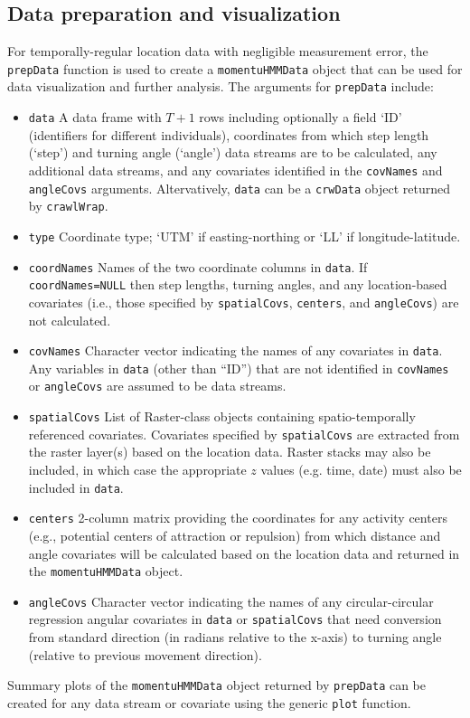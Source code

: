\documentclass[12pt]{article}
\begin{document}
\subsection{Data preparation and visualization}
For temporally-regular location data with negligible measurement error, the \verb|prepData| function is used to create a \verb|momentuHMMData| object that can be used for data visualization and further analysis. The arguments for \verb|prepData| include:
\begin{itemize}
  \item{\verb|data|} A data frame with $T+1$ rows including optionally a field `ID' (identifiers for different individuals), coordinates from which step length (`step') and turning angle (`angle') data streams are to be calculated, any additional data streams, and any covariates identified in the \verb|covNames| and \verb|angleCovs| arguments. Altervatively, \verb|data| can be a \verb|crwData| object returned by \verb|crawlWrap|.
  \item{\verb|type|} Coordinate type; `UTM' if easting-northing or `LL' if longitude-latitude.
  \item{\verb|coordNames|} Names of the two coordinate columns in \verb|data|. If \verb|coordNames=NULL| then step lengths, turning angles, and any location-based covariates (i.e., those specified by \verb|spatialCovs|, \verb|centers|, and \verb|angleCovs|) are not calculated.
  \item{\verb|covNames|} Character vector indicating the names of any covariates in \verb|data|. Any variables in \verb|data| (other than ``ID'') that are not identified in \verb|covNames| or \verb|angleCovs| are assumed to be data streams.
  \item{\verb|spatialCovs|} List of Raster-class objects \citep{Hijmans2016} containing spatio-temporally referenced covariates. Covariates specified by \verb|spatialCovs| are extracted from the raster layer(s) based on the location data. Raster stacks may also be included, in which case the appropriate $z$ values (e.g. time, date) must also be included in \verb|data|.
  \item{\verb|centers|} 2-column matrix providing the coordinates for any activity centers (e.g., potential centers of attraction or repulsion) from which distance and angle covariates will be calculated based on the location data and returned in the \verb|momentuHMMData| object.
  \item{\verb|angleCovs|} Character vector indicating the names of any circular-circular regression angular covariates in \verb|data| or \verb|spatialCovs| that need conversion from standard direction (in radians relative to the x-axis) to turning angle (relative to previous movement direction).
\end{itemize}
Summary plots of the \verb|momentuHMMData| object returned by \verb|prepData| can be created for any data stream or covariate using the generic \verb|plot| function.
\end{document}
